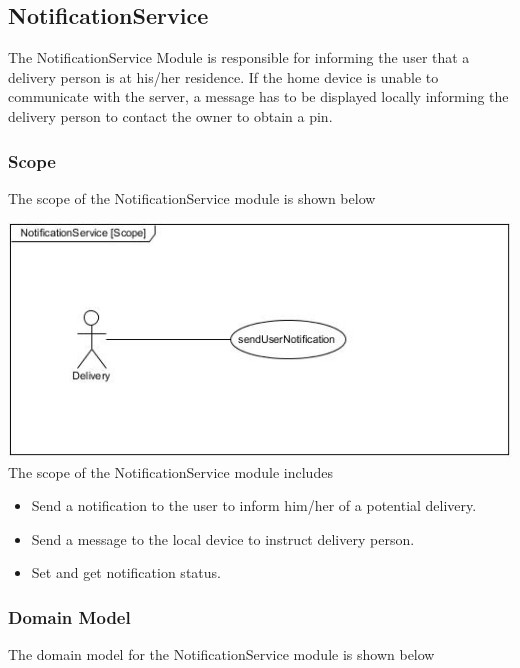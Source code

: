 \documentclass[a4paper,12pt]{article}
\begin{document}
	\subsection{NotificationService}
	The NotificationService Module is responsible for informing the user that a delivery person is at his/her residence. If the home device is unable to communicate with the server, a message has to be displayed locally informing the delivery person to contact the owner to obtain a pin. 
	
	\subsubsection{Scope}
	The scope of the NotificationService module is shown below
	
	\includegraphics[width=1\textwidth]{./Pictures/UML/Usecase/NotificationServiceUseCase.jpg}\\[0cm]
	
	{\noindent}The scope of the NotificationService module includes
	\begin{itemize}
		\item Send a notification to the user to inform him/her of a potential delivery.
		\item Send a message to the local device to instruct delivery person.
		\item Set and get notification status.
	\end{itemize}
	
	\subsubsection{Domain Model}
	The domain model for the NotificationService module is shown below
	
\end{document}
